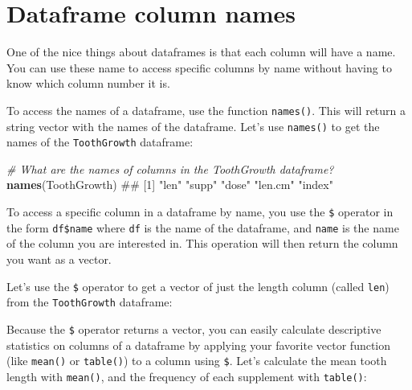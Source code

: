 \documentclass[]{book}
\newenvironment{Shaded}{\begin{snugshade}}{\end{snugshade}}
\newcommand{\KeywordTok}[1]{\textcolor[rgb]{0.13,0.29,0.53}{\textbf{{#1}}}}
\newcommand{\CommentTok}[1]{\textcolor[rgb]{0.56,0.35,0.01}{\textit{{#1}}}}
\newcommand{\NormalTok}[1]{{#1}}
\theoremstyle{definition}
\theoremstyle{definition}
\theoremstyle{remark}
\begin{document}
\section{Dataframe column names}\label{dataframe-column-names}

One of the nice things about dataframes is that each column will have a
name. You can use these name to access specific columns by name without
having to know which column number it is.

To access the names of a dataframe, use the function \texttt{names()}.
This will return a string vector with the names of the dataframe. Let's
use \texttt{names()} to get the names of the \texttt{ToothGrowth}
dataframe:

\begin{Shaded}
\begin{Highlighting}[]
\CommentTok{# What are the names of columns in the ToothGrowth dataframe?}
\KeywordTok{names}\NormalTok{(ToothGrowth)}
\NormalTok{## [1] "len"    "supp"   "dose"   "len.cm" "index"}
\end{Highlighting}
\end{Shaded}

To access a specific column in a dataframe by name, you use the
\texttt{\$} operator in the form \texttt{df\$name} where \texttt{df} is
the name of the dataframe, and \texttt{name} is the name of the column
you are interested in. This operation will then return the column you
want as a vector.

Let's use the \texttt{\$} operator to get a vector of just the length
column (called \texttt{len}) from the \texttt{ToothGrowth} dataframe:

\begin{Shaded}
\end{Shaded}

Because the \texttt{\$} operator returns a vector, you can easily
calculate descriptive statistics on columns of a dataframe by applying
your favorite vector function (like \texttt{mean()} or \texttt{table()})
to a column using \texttt{\$}. Let's calculate the mean tooth length
with \texttt{mean()}, and the frequency of each supplement with
\texttt{table()}:
\end{document}
